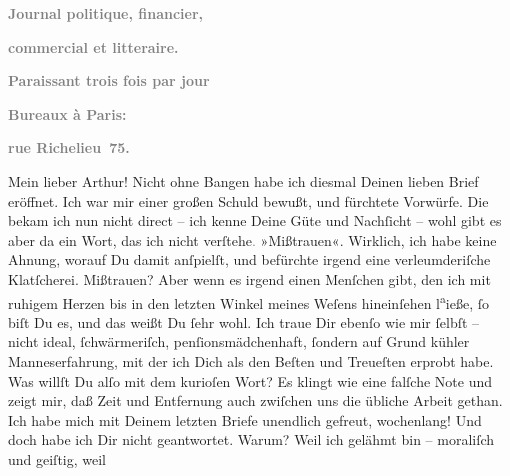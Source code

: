\begin{ledgroupsized}[t]{13cm}
           \pstart
           \begin{otherlanguage}{french}\textcolor{gray}{\textbf{Journal politique, financier,}}\end{otherlanguage}\pend
           \pstart
           \begin{otherlanguage}{french}\textcolor{gray}{\textbf{commercial et litteraire.}}\end{otherlanguage}\pend
           \pstart
           \begin{otherlanguage}{french}\textcolor{gray}{\textbf{\textbf{Paraissant trois fois par jour}}}\end{otherlanguage}\pend
           \pstart
           \begin{otherlanguage}{french}\textcolor{gray}{\textbf{\textbf{Bureaux à Paris:}}}\end{otherlanguage}\pend
           \pstart
           \begin{otherlanguage}{french}\textcolor{gray}{\textbf{\textbf{rue Richelieu 75.}}}\end{otherlanguage}\pend
           \pstart\center{}Mein lieber Arthur!\pend\pstart
           Nicht ohne Bangen habe ich diesmal Deinen lieben Brief eröffnet. Ich war mir einer
               großen Schuld bewußt, und fürchtete Vorwürfe. Die bekam ich nun nicht direct – ich
               kenne Deine Güte und Nachſicht – wohl gibt es aber da ein Wort, das ich nicht
                  verſtehe\textcolor{gray}{.} »Mißtrauen«. Wirklich, ich habe keine Ahnung, worauf
               Du damit anſpielſt, und befürchte irgend eine verleumderiſche Klatſcherei. Mißtrauen?
               Aber wenn es irgend einen Menſchen gibt, den ich mit ruhigem Herzen bis in den
               letzten Winkel meines Weſens hineinſehen l\substVorne{}\textsuperscript{a}\substDazwischen{}ie\substHinten{}ße, ſo {\pb}biſt Du es, und das weißt Du ſehr
               wohl. Ich traue Dir ebenſo wie mir ſelbſt – nicht ideal, ſchwärmeriſch,
               penſionsmädchenhaft, ſondern auf Grund kühler Manneserfahrung, mit der ich Dich als
               den Beſten und Treueſten erprobt habe. Was willſt Du alſo mit dem kurioſen Wort? Es
               klingt wie eine falſche Note und zeigt mir, daß Zeit und Entfernung auch zwiſchen uns
               die übliche Arbeit gethan.\pend
           \pstart
           Ich habe mich mit Deinem letzten Briefe unendlich gefreut, wochenlang! Und doch habe
               ich Dir nicht geantwortet. Warum? Weil ich gelähmt bin – moraliſch und geiſtig, weil

\end{ledgroupsized}
